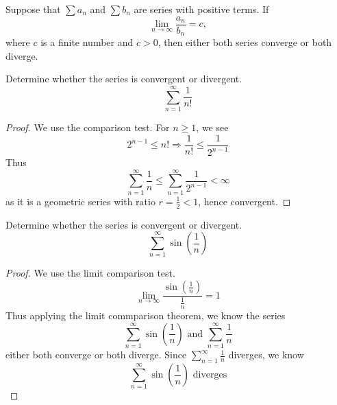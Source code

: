 \documentclass[openany]{book}
\begin{document}
\begin{prop}
    Suppose that $\sum a_n$ and $\sum b_n$ are series
with positive terms. If
\[
\lim_{n\to\infty}\frac{a_n}{b_n}=c,
\]
where $c$ is a finite number and $c>0$,
then either both series converge or both diverge.
\end{prop}



\begin{prob}
    Determine whether the series is convergent or divergent.
    \[
        \sum_{n=1}^{\infty} \frac{1}{n!}
        \]
\end{prob}
\begin{proof}
    We use the comparison test.
    For $n\geq 1$, we see 
    \begin{equation*}
        2^{n-1}\leq n!\Rightarrow \frac{1}{n!}\leq\frac{1}{2^{n-1}}
    \end{equation*}
    Thus 
    \begin{equation*}
        \sum_{n=1}^\infty\frac{1}{n}\leq\sum_{n=1}^\infty\frac{1}{2^{n-1}}<\infty
    \end{equation*}
    as it is a geometric series with ratio $r=\frac{1}{2}<1$, hence convergent.
\end{proof}







\begin{prob}
    Determine whether the series is convergent or divergent.
    \[
    \sum_{n=1}^{\infty} \sin\left(\frac{1}{n}\right)
    \]
\end{prob}
\begin{proof}
    We use the limit comparison test.
    \begin{equation*}
        \lim_{n\to\infty}\frac{\sin\left(\frac{1}{n}\right)}{\frac{1}{n}}=1
    \end{equation*}
    Thus applying the limit commparison theorem, we know the series 
    \begin{equation*}
        \sum_{n=1}^\infty\sin\left(\frac{1}{n}\right) \text{ and } \sum_{n=1}^\infty\frac{1}{n}
    \end{equation*}
    either both converge or both diverge. Since $\sum_{n=1}^\infty\frac{1}{n}$ diverges, we know 
    \begin{equation*}
        \sum_{n=1}^\infty\sin\left(\frac{1}{n}\right) \text{ diverges}
    \end{equation*}
\end{proof}
\end{document}
